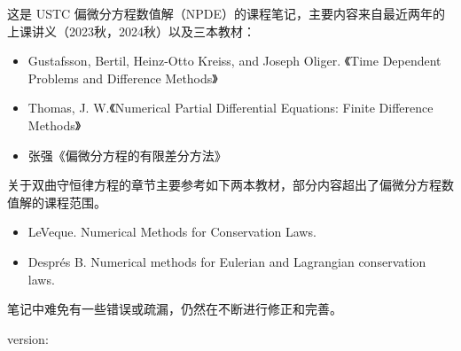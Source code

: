这是 USTC 偏微分方程数值解（NPDE）的课程笔记，主要内容来自最近两年的上课讲义（2023秋，2024秋）以及三本教材：
\begin{itemize}
    \item Gustafsson, Bertil, Heinz-Otto Kreiss, and Joseph Oliger. 《Time Dependent Problems and Difference Methods》
    \item Thomas, J. W.《Numerical Partial Differential Equations: Finite Difference Methods》
    \item 张强《偏微分方程的有限差分方法》
\end{itemize}
关于双曲守恒律方程的章节主要参考如下两本教材，部分内容超出了偏微分方程数值解的课程范围。
\begin{itemize}
    \item LeVeque. Numerical Methods for Conservation Laws.
    \item Després B. Numerical methods for Eulerian and Lagrangian conservation laws.
\end{itemize}
笔记中难免有一些错误或疏漏，仍然在不断进行修正和完善。

\vfill
\begin{center}
    version: 
\end{center}
